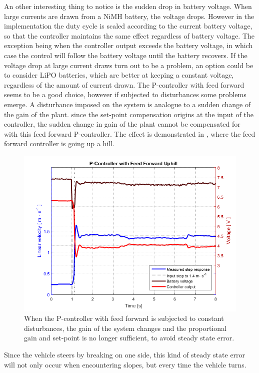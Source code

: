 An other interesting thing to notice is the sudden drop in battery voltage. When large currents are drawn from a NiMH battery, the voltage drops\cite{BatteryDS}. However in the implementation the duty cycle is scaled according to the current battery voltage, so that the controller maintains the same effect regardless of battery voltage. The exception being when the controller output exceeds the battery voltage, in which case the control will follow the battery voltage until the battery recovers. If the voltage drop at large current draws turn out to be a problem, an option could be to consider LiPO batteries, which are better at keeping a constant voltage, regardless of the amount of current drawn.
%
The P-controller with feed forward seems to be a good choice, however if subjected to disturbances some problems emerge. A disturbance imposed on the system is analogue to a sudden change of the gain of the plant. since the set-point compensation origins at the input of the controller, the sudden change in gain of the plant cannot be compensated for with this feed forward P-controller.
%
The effect is demonstrated in , where the feed forward controller is going up a hill.
%
\begin{figure}[H]
 	\centering
 	\includegraphics[width=.9\textwidth]{figures/hillPfeedForward}
 	\caption{When the P-controller with feed forward is subjected to constant disturbances, the gain of the system changes and the proportional gain and set-point is no longer sufficient, to avoid steady state error.}
 	\label{fig:hillPfeedForward}
\end{figure}
%
Since the vehicle steers by breaking on one side, this kind of steady state error will not only occur when encountering slopes, but every time the vehicle turns.
%
